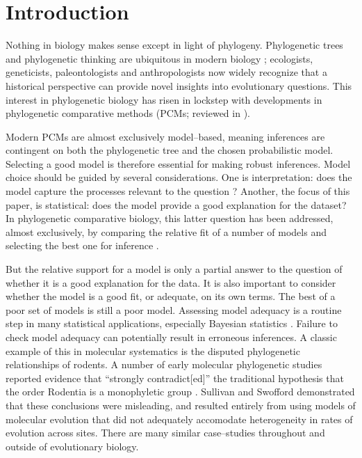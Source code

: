 \documentclass[a4paper,12pt]{article}
\begin{document}
\section{Introduction}
Nothing in biology makes sense except in light of phylogeny. Phylogenetic trees and phylogenetic thinking are ubiquitous in modern biology \citep{PennellHarmon}; ecologists, geneticists, paleontologists and anthropologists now widely recognize that a historical perspective can provide novel insights into evolutionary questions. This interest in phylogenetic biology has risen in lockstep with developments in phylogenetic comparative methods (PCMs; reviewed in \citep{PennellHarmon}). 

Modern PCMs are almost exclusively model--based, meaning inferences are contingent on both the phylogenetic tree and the chosen probabilistic model. Selecting a good model is therefore essential for making robust inferences. Model choice should be guided by several considerations. 
One is interpretation: does the model capture the processes relevant to the question \citep{HansenOrzack2005, Hansen2012, PennellPE}? 
Another, the focus of this paper, is statistical: does the model provide a good explanation for the dataset? 
%
%
In phylogenetic comparative biology, this latter question has been addressed, almost exclusively, by comparing the relative fit of a number of models and selecting the best one for inference \citep{Mooers1999, Harmon2010, Hunt2012}. 

But the relative support for a model is only a partial answer to the question of whether it is a good explanation for the data. It is also important to consider whether the model is a good fit, or adequate, 
on its own terms. The best of a poor set of models is still a poor model. Assessing model adequacy is a routine step in many statistical applications, especially Bayesian statistics \citep{Gelmanbook}. Failure to check model adequacy can potentially result in erroneous inferences. A classic example of this in molecular systematics is the disputed phylogenetic relationships of rodents. A number of early molecular phylogenetic studies reported evidence that ``strongly contradict[ed]'' the traditional hypothesis that the order Rodentia is a monophyletic group \citep{Graur1991, DErchia1996}. Sullivan and Swofford \citep{SullivanSwofford} demonstrated that these conclusions were misleading, and resulted entirely from using models of molecular evolution that did not adequately accomodate  heterogeneity in rates of evolution across sites. There are many similar case--studies throughout and outside of evolutionary biology.
\end{document}
